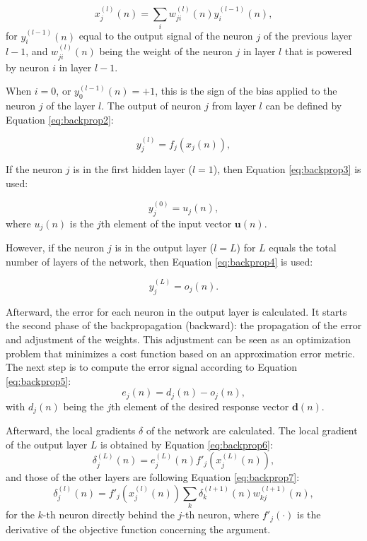 \begin{equation}
\label{eq:backprop1}
    x_j^{(l)}(n) = \sum_i w_{ji}^{(l)}(n) y_i^{(l-1)}(n),
\end{equation}
for $y_i^{(l-1)}(n)$ equal to the output signal of the neuron $j$ of the previous layer $l-1$, and $w_{ji}^{(l)}(n)$ being the weight of the neuron $j$ in layer $l$ that is powered by neuron $i$ in layer $l-1$.

When $i=0$, or $y_0^{(l-1)}(n) = +1$, this is the sign of the bias applied to the neuron $j$ of the layer $l$. The output of neuron $j$ from layer $l$ can be defined by Equation \ref{eq:backprop2}:

\begin{equation}
\label{eq:backprop2}
    y_j^{(l)} = f_j (x_j (n) ),
\end{equation}

If the neuron $j$ is in the first hidden layer ($l = 1$), then Equation \ref{eq:backprop3} is used:

\begin{equation}
    \label{eq:backprop3}
    y_j^{(0)} = u_j (n),
\end{equation}
where $u_j(n)$ is the $j$th element of the input vector $\mathbf{u}(n)$. 

However, if the neuron $j$ is in the output layer ($l = L$) for $L$ equals the total number of layers of the network, then Equation \ref{eq:backprop4} is used:

\begin{equation}
    \label{eq:backprop4}
    y_j^{(L)} = o_j (n).
\end{equation}

Afterward, the error for each neuron in the output layer is calculated. It starts the second phase of the backpropagation (backward): the propagation of the error and adjustment of the weights. This adjustment can be seen as an optimization problem that minimizes a cost function based on an approximation error metric. The next step is to compute the error signal according to Equation \ref{eq:backprop5}:
\begin{equation}
    \label{eq:backprop5}
    e_j (n) = d_j(n) - o_j (n),
\end{equation}
with $d_j (n)$ being the $j$th element of the desired response vector $\mathbf{d}(n)$.

Afterward, the local gradients $\delta$ of the network are calculated. The local gradient of the output layer $L$ is obtained by Equation \ref{eq:backprop6}:
\begin{equation}
    \label{eq:backprop6}
    \delta_j^{(L)} (n) = e_j^{(L)}(n) {f}'_j (x_j^{(L)}(n)),
\end{equation}
and those of the other layers are following Equation \ref{eq:backprop7}:
\begin{equation}
    \label{eq:backprop7}
    \delta_j^{(l)} (n) = {f}'_j (x_j^{(l)}(n)) \sum_k \delta_k^{(l+1)} (n) w_{kj}^{(l+1)}(n),
\end{equation}
for the $k$-th neuron directly behind the $j$-th neuron, where ${f}'_j(\cdot)$ is the derivative of the objective function concerning the argument.

